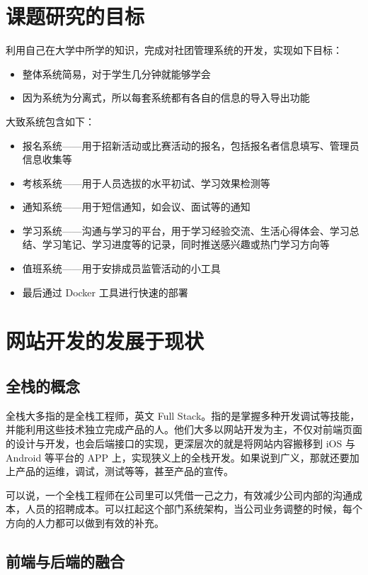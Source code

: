 \section{课题研究的目标}
\label{sec:requirements}

利用自己在大学中所学的知识，完成对社团管理系统的开发，实现如下目标：
\begin{itemize}
  \item 整体系统简易，对于学生几分钟就能够学会
  \item 因为系统为分离式，所以每套系统都有各自的信息的导入导出功能
\end{itemize}
大致系统包含如下：
\begin{itemize}
  \item 报名系统——用于招新活动或比赛活动的报名，包括报名者信息填写、管理员信息收集等
  \item 考核系统——用于人员选拔的水平初试、学习效果检测等
  \item 通知系统——用于短信通知，如会议、面试等的通知
  \item 学习系统——沟通与学习的平台，用于学习经验交流、生活心得体会、学习总结、学习笔记、学习进度等的记录，同时推送感兴趣或热门学习方向等
  \item 值班系统——用于安排成员监管活动的小工具
  \item 最后通过 Docker 工具进行快速的部署
\end{itemize}

\section{网站开发的发展于现状}
\label{sec:requirements}

\subsection{全栈的概念}
\label{sec:requirements}

全栈大多指的是全栈工程师，英文 Full Stack。指的是掌握多种开发调试等技能，并能利用这些技术独立完成产品的人。他们大多以网站开发为主，不仅对前端页面的设计与开发，也会后端接口的实现，更深层次的就是将网站内容搬移到 iOS 与 Android 等平台的 APP 上，实现狭义上的全栈开发。如果说到广义，那就还要加上产品的运维，调试，测试等等，甚至产品的宣传。

可以说，一个全栈工程师在公司里可以凭借一己之力，有效减少公司内部的沟通成本，人员的招聘成本。可以扛起这个部门系统架构，当公司业务调整的时候，每个方向的人力都可以做到有效的补充。

\subsection{前端与后端的融合}
\label{sec:requirements}

